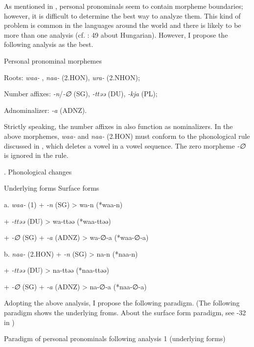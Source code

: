 As mentioned in , personal pronominals seem to contain morpheme boundaries; however, it is difficult to determine the best way to analyze them. This kind of problem is common in the languages around the world and there is likely to be more than one analysis (cf. \citealt{Comrie1989}: 49 about Hungarian). However, I propose the following analysis as the best.

\ea \label{ex:5:14}  Personal pronominal morphemes

Roots:      \textit{waa-} , \textit{naa-} (2.HON), \textit{ura-} (2.NHON);

Number affixes:  \textit{{}-n}/\textit{{}-∅} (SG), \textit{{}-ttəə} (DU), \textit{{}-kja} (PL);

Adnominalizer:  \textit{{}-a} (ADNZ).
\z

Strictly speaking, the number affixes in  also function as nominalizers. In the above morphemes, \textit{waa-}  and \textit{naa-} (2.HON) must conform to the phonological rule discussed in , which deletes a vowel in a vowel sequence. The zero morpheme \textit{{}-∅} is ignored in the rule.

\begin{styleBeschriftung}
\textmd{. Phonological changes}
\end{styleBeschriftung}

  Underlying forms    Surface forms

a.  \textit{waa-}  (1)  +  \textit{{}-n} (SG)    >  wa-n  (*waa-n)

    +  \textit{{}-ttəə} (DU)    >  wa-ttəə  (*waa-ttəə)

    +  \textit{{}-∅} (SG)  +  \textit{{}-a} (ADNZ)  >  wa-∅-a  (*waa-∅-a)

b.  \textit{naa-}  (2.HON)  +  \textit{{}-n} (SG)    >  na-n  (*naa-n)

    +  \textit{{}-ttəə} (DU)    >  na-ttəə  (*naa-ttəə)

    +  \textit{{}-∅} (SG)  +  \textit{{}-a} (ADNZ)  >  na-∅-a  (*naa-∅-a)

Adopting the above analysis, I propose the following paradigm. (The following paradigm shows the underlying froms. About the surface form paradigm, see -32 in )

\begin{styleBeschriftung}
\textmd{ Paradigm of personal pronominals following analysis 1 (underlying forms)}
\end{styleBeschriftung}

